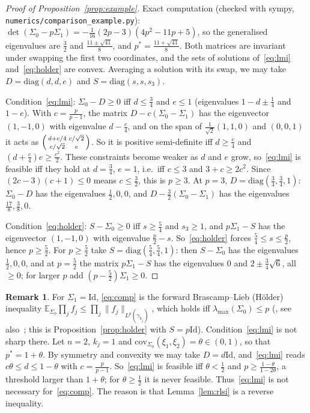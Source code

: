 \documentclass[11pt]{amsart}
\theoremstyle{definition}
\newtheorem{remark}[theorem]{Remark}
\newcommand{\E}{\mathbb{E}}
\newcommand{\Id}{\mathrm{Id}}
\begin{document}
\begin{proof}[Proof of Proposition~\ref{prop:example}]
Exact computation (checked with sympy, \texttt{numerics/comparison\_example.py}): $\det(\Sigma_0-p\Sigma_1)
=-\frac1{16}(2p-3)(4p^2-11p+5)$, so the generalised eigenvalues are $\frac32$ and $\frac{11\pm\sqrt{41}}8$, and
$p^*=\frac{11+\sqrt{41}}8$. Both matrices are invariant under swapping the first two coordinates, and the sets of
solutions of~\eqref{eq:lmi} and~\eqref{eq:holder} are convex. Averaging a solution with its swap, we may take
$D=\mathrm{diag}(d,d,e)$ and $S=\mathrm{diag}(s,s,s_3)$.

Condition~\eqref{eq:lmi}: $\Sigma_0-D\ge0$ iff $d\le\frac34$ and $e\le1$ (eigenvalues $1-d\pm\frac14$ and $1-e$).
With $c=\frac p{p-1}$, the matrix $D-c(\Sigma_0-\Sigma_1)$ has the eigenvector $(1,-1,0)$ with eigenvalue
$d-\frac c4$, and on the span of $\frac1{\sqrt2}(1,1,0)$ and $(0,0,1)$ it acts as
$\begin{psmallmatrix}d+c/4&c/\sqrt2\\c/\sqrt2&e\end{psmallmatrix}$. So it is positive semi-definite iff
$d\ge\frac c4$ and $(d+\frac c4)e\ge\frac{c^2}2$. These constraints become weaker as $d$ and $e$ grow, so~\eqref{eq:lmi}
is feasible iff they hold at $d=\frac34$, $e=1$, i.e.\ iff $c\le3$ and $3+c\ge2c^2$. Since $(2c-3)(c+1)\le0$ means
$c\le\frac32$, this is $p\ge3$. At $p=3$, $D=\mathrm{diag}(\frac34,\frac34,1)$: $\Sigma_0-D$ has the eigenvalues
$\frac12,0,0$, and $D-\frac32(\Sigma_0-\Sigma_1)$ has the eigenvalues $\frac{17}8,\frac38,0$.

Condition~\eqref{eq:holder}: $S-\Sigma_0\ge0$ iff $s\ge\frac54$ and $s_3\ge1$, and $p\Sigma_1-S$ has the eigenvector
$(1,-1,0)$ with eigenvalue $\frac p2-s$. So~\eqref{eq:holder} forces $\frac54\le s\le\frac p2$, hence $p\ge\frac52$.
For $p\ge\frac52$ take $S=\mathrm{diag}(\frac54,\frac54,1)$: then $S-\Sigma_0$ has the eigenvalues $\frac12,0,0$, and at
$p=\frac52$ the matrix $p\Sigma_1-S$ has the eigenvalues $0$ and $2\pm\frac34\sqrt6$, all $\ge0$; for larger $p$ add
$(p-\frac52)\Sigma_1\ge0$.
\end{proof}

\begin{remark}\label{rem:forward}
For $\Sigma_1=\Id$, \eqref{eq:comp} is the forward Brascamp--Lieb (H\"older) inequality
$\E_{\Sigma_0}\prod_jf_j\le\prod_j\|f_j\|_{L^p(\gamma_{k_j})}$, which holds iff $\lambda_{\max}(\Sigma_0)\le p$
(\cite{CDP15}, see also~\cite{Ledoux14}; this is Proposition~\ref{prop:holder} with $S=p\Id$). Condition~\eqref{eq:lmi}
is not sharp there. Let $n=2$, $k_j=1$ and $\mathrm{cov}_{\Sigma_0}(\xi_1,\xi_2)=\theta\in(0,1)$, so that $p^*=1+\theta$.
By symmetry and convexity we may take $D=d\Id$, and~\eqref{eq:lmi} reads $c\theta\le d\le1-\theta$ with
$c=\frac p{p-1}$. So~\eqref{eq:lmi} is feasible iff $\theta<\frac12$ and $p\ge\frac{1-\theta}{1-2\theta}$, a
threshold larger than $1+\theta$; for $\theta\ge\frac12$ it is never feasible. Thus~\eqref{eq:lmi} is not necessary
for~\eqref{eq:comp}. The reason is that Lemma~\ref{lem:rlsi} is a reverse inequality.
\end{remark}
\end{document}
